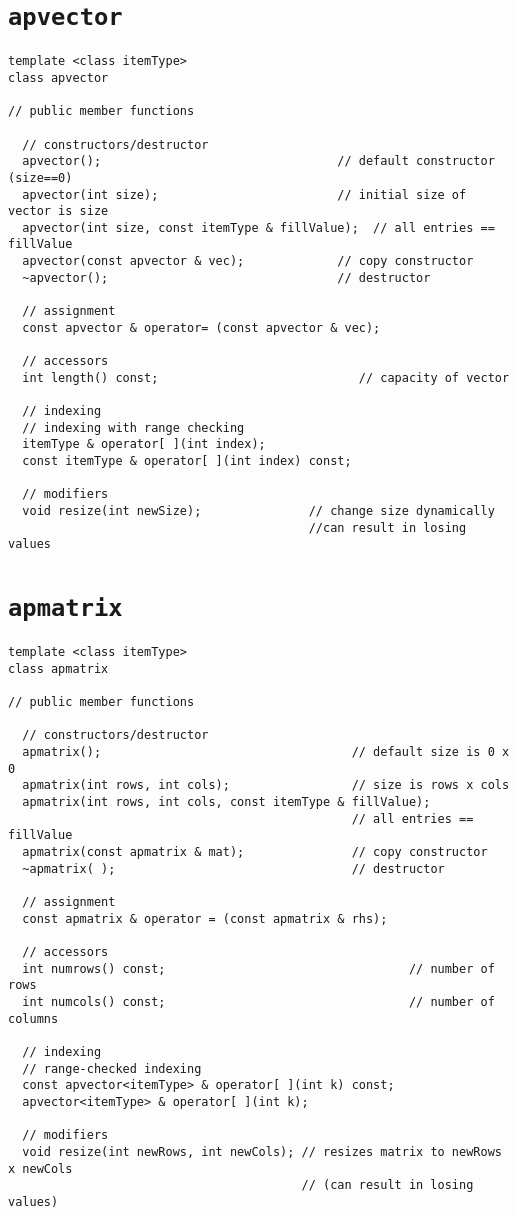 \section{{\tt apvector}}

\begin{verbatim}
template <class itemType>
class apvector

// public member functions

  // constructors/destructor
  apvector();                                 // default constructor (size==0)
  apvector(int size);                         // initial size of vector is size
  apvector(int size, const itemType & fillValue);  // all entries == fillValue
  apvector(const apvector & vec);             // copy constructor
  ~apvector();                                // destructor

  // assignment
  const apvector & operator= (const apvector & vec);

  // accessors
  int length() const;                            // capacity of vector

  // indexing
  // indexing with range checking
  itemType & operator[ ](int index);           
  const itemType & operator[ ](int index) const;

  // modifiers
  void resize(int newSize);               // change size dynamically
                                          //can result in losing values
\end{verbatim}

\section{{\tt apmatrix}}

\begin{verbatim}
template <class itemType>
class apmatrix

// public member functions

  // constructors/destructor
  apmatrix();                                   // default size is 0 x 0
  apmatrix(int rows, int cols);                 // size is rows x cols
  apmatrix(int rows, int cols, const itemType & fillValue);
                                                // all entries == fillValue
  apmatrix(const apmatrix & mat);               // copy constructor
  ~apmatrix( );                                 // destructor

  // assignment
  const apmatrix & operator = (const apmatrix & rhs);

  // accessors
  int numrows() const;                                  // number of rows
  int numcols() const;                                  // number of columns

  // indexing
  // range-checked indexing
  const apvector<itemType> & operator[ ](int k) const;  
  apvector<itemType> & operator[ ](int k);

  // modifiers
  void resize(int newRows, int newCols); // resizes matrix to newRows x newCols
                                         // (can result in losing values)
\end{verbatim}

